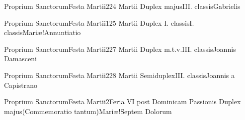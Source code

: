 \documentclass[nocturnale-romanum.tex]{subfiles}
\begin{document}
	{Proprium Sanctorum}{Festa Martii}{2}{24 Martii}
	{Duplex majus}{III. classis}{Gabrielis}
	{}
	{}

	{Proprium Sanctorum}{Festa Martii}{1}{25 Martii}
	{Duplex I. classis}{I. classis}{Mariæ!Annuntiatio}
	{}
	{}

	{Proprium Sanctorum}{Festa Martii}{2}{27 Martii}
	{Duplex m.t.v.}{III. classis}{Joannis Damasceni}
	{}
	{}

	{Proprium Sanctorum}{Festa Martii}{2}{28 Martii}
	{Semiduplex}{III. classis}{Joannis a Capistrano}
	{}
	{}

	{Proprium Sanctorum}{Festa Martii}{2}{Feria VI post Dominicam Passionis}
	{Duplex majus}{(Commemoratio tantum)}{Mariæ!Septem Dolorum}
	{}
	{}
\end{document}
